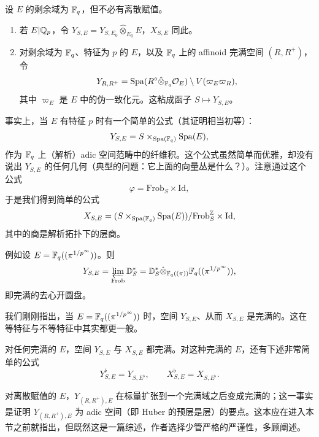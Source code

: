 \begin{definition}\label{def:1.5}
设 $E$ 的剩余域为 $\mathbb{F}_q$，但不必有离散赋值。
\begin{enumerate}[label=(\arabic*)]
  \item 若 $E|\mathbb{Q}_p$，令 $Y_{S,E}=Y_{S,E_0}\hat\otimes_{E_0}E$，$X_{S,E}$ 同此。
  \item 对剩余域为 $\mathbb{F}_q$、特征为 $p$ 的 $E$，以及 $\mathbb{F}_q$ 上的 affinoid 完满空间 $(R,R^+)$，令
  \[
    Y_{R,R^+}=\mathrm{Spa}(R^\circ\hat\otimes_{\mathbb{F}_q}\mathcal{O}_E)\setminus V(\varpi_E\varpi_R),
  \]
  其中 $\varpi_E$ 是 $E$ 中的伪一致化元。这粘成函子 $S\mapsto Y_{S,E}$。
\end{enumerate}
\end{definition}

事实上，当 $E$ 有特征 $p$ 时有一个简单的公式（其证明相当初等）：
\begin{equation}\label{eq:1.2}
  Y_{S,E}=S\times_{\mathrm{Spa}(\mathbb{F}_q)}\mathrm{Spa}(E),
\end{equation}
作为 $\mathbb{F}_q$ 上（解析）adic 空间范畴中的纤维积。这个公式虽然简单而优雅，却没有说出 $Y_{S,E}$ 的任何几何（典型的问题：它上面的向量丛是什么？）。注意通过这个公式
\[
  \varphi=\mathrm{Frob}_S\times\mathrm{Id},
\]
于是我们得到简单的公式
\begin{equation}\label{eq:1.3}
  X_{S,E}=(S\times_{\mathrm{Spa}(\mathbb{F}_q)}\mathrm{Spa}(E))/\mathrm{Frob}_S^{\mathbb{Z}}\times\mathrm{Id},
\end{equation}
其中的商是解析拓扑下的层商。

例如设 $E=\mathbb{F}_q((\pi^{1/p^\infty}))$。则
\[
  Y_{S,E}=\varprojlim_{\mathrm{Frob}}\mathbb{D}^*_S=\mathbb{D}^*_S\hat\otimes_{\mathbb{F}_q((\pi))}\mathbb{F}_q((\pi^{1/p^\infty})),
\]
即完满的去心开圆盘。

我们刚刚指出，当 $E=\mathbb{F}_q((\pi^{1/p^\infty}))$ 时，空间 $Y_{S,E}$、从而 $X_{S,E}$ 是完满的。这在等特征与不等特征中其实都更一般。

\begin{proposition}\label{prop:1.6}
对任何完满的 $E$，空间 $Y_{S,E}$ 与 $X_{S,E}$ 都完满。对这种完满的 $E$，还有下述非常简单的公式
\[
  Y^\flat_{S,E}=Y_{S,E^\flat},\qquad X^\flat_{S,E}=X_{S,E^\flat}.
\]
\end{proposition}

\begin{remark}\label{rem:1.7}
对离散赋值的 $E$，$Y_{(R,R^+),E}$ 在标量扩张到一个完满域之后变成完满的；这一事实是证明 $Y_{(R,R^+),E}$ 为 adic 空间（即 Huber 的预层是层）的要点。这本应在进入本节之前就指出，但既然这是一篇综述，作者选择少管严格的严谨性，多顾阐述。
\end{remark}

